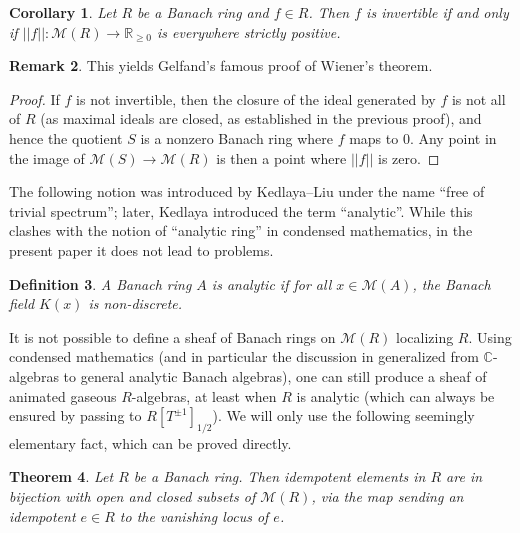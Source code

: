 \documentclass[11pt]{amsart}
\numberwithin{equation}{section}
\newtheorem{theorem}{Theorem}
\numberwithin{theorem}{section}
\newtheorem{corollary}[theorem]{Corollary}
\newtheorem{definition}[theorem]{Definition}
\theoremstyle{definition}
\newtheorem{remark}[theorem]{Remark}
\begin{document}
\begin{corollary} Let $R$ be a Banach ring and $f\in R$. Then $f$ is invertible if and only if $||f||: \mathcal M(R)\to \mathbb R_{\geq 0}$ is everywhere strictly positive.
\end{corollary}

\begin{remark} This yields Gelfand's famous proof of Wiener's theorem.
\end{remark}

\begin{proof} If $f$ is not invertible, then the closure of the ideal generated by $f$ is not all of $R$ (as maximal ideals are closed, as established in the previous proof), and hence the quotient $S$ is a nonzero Banach ring where $f$ maps to $0$. Any point in the image of $\mathcal M(S)\to \mathcal M(R)$ is then a point where $||f||$ is zero.
\end{proof}

The following notion was introduced by Kedlaya--Liu \cite[Remark 2.3.9 (d)]{KedlayaLiu1} under the name ``free of trivial spectrum''; later, Kedlaya \cite[Definition 1.1.2]{KedlayaAWS} introduced the term ``analytic''. While this clashes with the notion of ``analytic ring'' in condensed mathematics, in the present paper it does not lead to problems.

\begin{definition} A Banach ring $A$ is analytic if for all $x\in \mathcal M(A)$, the Banach field $K(x)$ is non-discrete.
\end{definition}

It is not possible to define a sheaf of Banach rings on $\mathcal M(R)$ localizing $R$. Using condensed mathematics (and in particular the discussion in \cite[Lecture 5, Corollary 5.10]{Complex} generalized from $\mathbb C$-algebras to general analytic Banach algebras), one can still produce a sheaf of animated gaseous $R$-algebras, at least when $R$ is analytic (which can always be ensured by passing to $R[T^{\pm 1}]_{1/2}$). We will only use the following seemingly elementary fact, which can be proved directly.

\begin{theorem}\label{thm:idempotents} Let $R$ be a Banach ring. Then idempotent elements in $R$ are in bijection with open and closed subsets of $\mathcal M(R)$, via the map sending an idempotent $e\in R$ to the vanishing locus of $e$.
\end{theorem}
\end{document}
